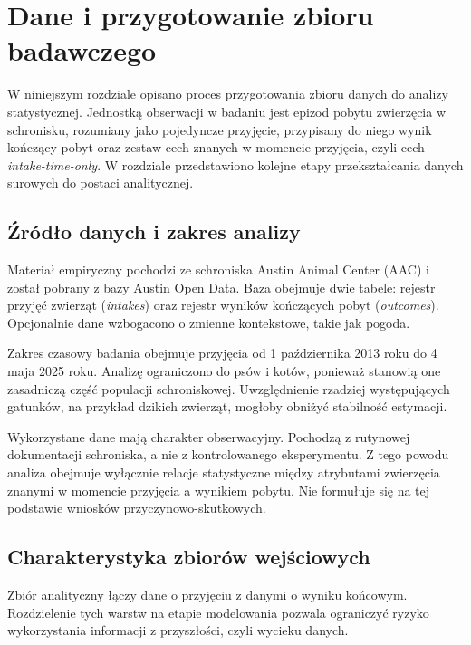 \chapter{Dane i przygotowanie zbioru badawczego}
\label{chap:dane-przygotowanie}

W niniejszym rozdziale opisano proces przygotowania zbioru danych do analizy statystycznej. Jednostką obserwacji w badaniu jest epizod pobytu zwierzęcia w schronisku, rozumiany jako pojedyncze przyjęcie, przypisany do niego wynik kończący pobyt oraz zestaw cech znanych w momencie przyjęcia, czyli cech \emph{intake-time-only}. W rozdziale przedstawiono kolejne etapy przekształcania danych surowych do postaci analitycznej.

\section{Źródło danych i zakres analizy}
\label{sec:zrodlo-danych-zakres}

Materiał empiryczny pochodzi ze schroniska Austin Animal Center (AAC) i został pobrany z bazy Austin Open Data. Baza obejmuje dwie tabele: rejestr przyjęć zwierząt (\emph{intakes}) oraz rejestr wyników kończących pobyt (\emph{outcomes}). Opcjonalnie dane wzbogacono o zmienne kontekstowe, takie jak pogoda.

Zakres czasowy badania obejmuje przyjęcia od 1 października 2013 roku do 4 maja 2025 roku. Analizę ograniczono do psów i kotów, ponieważ stanowią one zasadniczą część populacji schroniskowej. Uwzględnienie rzadziej występujących gatunków, na przykład dzikich zwierząt, mogłoby obniżyć stabilność estymacji.

Wykorzystane dane mają charakter obserwacyjny. Pochodzą z rutynowej dokumentacji schroniska, a nie z kontrolowanego eksperymentu. Z tego powodu analiza obejmuje wyłącznie relacje statystyczne między atrybutami zwierzęcia znanymi w momencie przyjęcia a wynikiem pobytu. Nie formułuje się na tej podstawie wniosków przyczynowo-skutkowych.

\section{Charakterystyka zbiorów wejściowych}
\label{sec:charakterystyka-zbiorow-wejsciowych}

Zbiór analityczny łączy dane o przyjęciu z danymi o wyniku końcowym. Rozdzielenie tych warstw na etapie modelowania pozwala ograniczyć ryzyko wykorzystania informacji z przyszłości, czyli wycieku danych.

